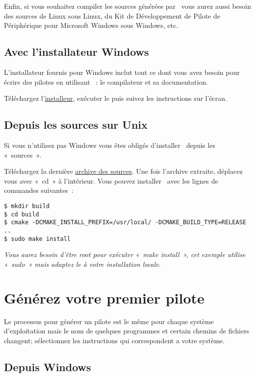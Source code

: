 \documentclass[francais]{rtxarticle}
\begin{document}
Enfin, si vous souhaitez compiler les sources générées par \rtx\ vous aurez
aussi besoin des sources de Linux sous Linux, du Kit de Développement de Pilote
de Périphérique pour Microsoft Windows sous Windows, etc.

\subsection{Avec l'installateur Windows}

L'installateur fournis pour Windows inclut tout ce dont vous avez besoin pour
écrire des pilotes en utilisant \rtx\ : le compilateur et sa documentation.

Téléchargez l'\href{http://rathaxes.googlecode.com/files/rathaxes-latest.exe}{installeur},
exécuter le puis suivez les instructions sur l'écran.

\subsection{Depuis les sources sur Unix}

Si vous n'utilisez pas Windows vous êtes obligés d'installer \rtx\ depuis les
«~sources~».

Téléchargez la dernière \href{http://rathaxes.googlecode.com/files/rathaxes-src-latest.tar.gz}
{archive des sources}. Une fois l'archive extraite, déplacez vous avec «~cd~» à
l'intérieur. Vous pouvez installer \rtx\ avec les lignes de commandes suivantes~:

\begin{lstlisting}
$ mkdir build
$ cd build
$ cmake -DCMAKE_INSTALL_PREFIX=/usr/local/ -DCMAKE_BUILD_TYPE=RELEASE ..
$ sudo make install
\end{lstlisting}

\emph{Vous aurez besoin d'être root pour exécuter «~make install~», cet exemple
utilise «~sudo~» mais adaptez le à votre installation locale}.

\section{Générez votre premier pilote}

Le processus pour générer un pilote est le même pour chaque système
d'exploitation mais le nom de quelques programmes et certain chemins de fichiers
changent; sélectionnez les instructions qui correspondent a votre système.

\subsection{Depuis Windows}
\end{document}
